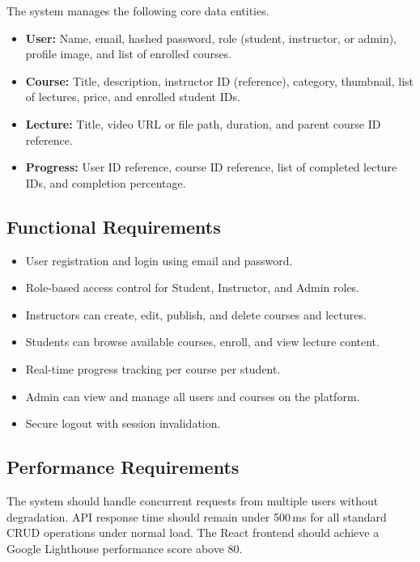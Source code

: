 \documentclass[12pt, a4paper, oneside]{report}
\begin{document}
The system manages the following core data entities.

\begin{itemize}[leftmargin=1.5cm, itemsep=2pt]
  \item \textbf{User:} Name, email, hashed password, role (student, instructor, or admin), profile image, and list of enrolled courses.
  \item \textbf{Course:} Title, description, instructor ID (reference), category, thumbnail, list of lectures, price, and enrolled student IDs.
  \item \textbf{Lecture:} Title, video URL or file path, duration, and parent course ID reference.
  \item \textbf{Progress:} User ID reference, course ID reference, list of completed lecture IDs, and completion percentage.
\end{itemize}

\subsection{Functional Requirements}

\begin{itemize}[leftmargin=1.5cm, itemsep=2pt]
  \item User registration and login using email and password.
  \item Role-based access control for Student, Instructor, and Admin roles.
  \item Instructors can create, edit, publish, and delete courses and lectures.
  \item Students can browse available courses, enroll, and view lecture content.
  \item Real-time progress tracking per course per student.
  \item Admin can view and manage all users and courses on the platform.
  \item Secure logout with session invalidation.
\end{itemize}

\subsection{Performance Requirements}

The system should handle concurrent requests from multiple users without degradation. API response time should remain under 500\,ms for all standard CRUD operations under normal load. The React frontend should achieve a Google Lighthouse performance score above 80.
\end{document}
